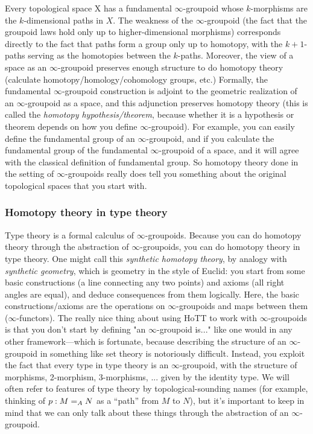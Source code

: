 Every topological space X has a fundamental $\infty$-groupoid whose
$k$-morphisms are the $k$-dimensional paths in $X$.  The weakness of the
$\infty$-groupoid (the fact that the groupoid laws hold only up to
higher-dimensional morphisms) corresponds directly to the fact that
paths form a group only up to homotopy, with the $k+1$-paths serving as the
homotopies between the $k$-paths.  Moreover, the view of a space as an
$\infty$-groupoid preserves enough structure to do homotopy theory
(calculate homotopy/homology/cohomology groups, etc.)  Formally, the
fundamental $\infty$-groupoid construction is adjoint to the geometric
realization of an $\infty$-groupoid as a space, and this adjunction
preserves homotopy theory (this is called the \emph{homotopy
  hypothesis/theorem}, because whether it is a hypothesis or theorem
depends on how you define $\infty$-groupoid).  For example, you can
easily define the fundamental group of an $\infty$-groupoid, and if you
calculate the fundamental group of the fundamental $\infty$-groupoid of
a space, and it will agree with the classical definition of fundamental
group.  So homotopy theory done in the setting of $\infty$-groupoids
really does tell you something about the original topological spaces
that you start with.  

\subsubsection{Homotopy theory in type theory}

Type theory is a formal calculus of $\infty$-groupoids. Because you can
do homotopy theory through the abstraction of $\infty$-groupoids, you
can do homotopy theory in type theory.  One might call this
\emph{synthetic homotopy theory}, by analogy with \emph{synthetic
  geometry}, which is geometry in the style of Euclid: you start from
some basic constructions (a line connecting any two points) and axioms
(all right angles are equal), and deduce consequences from them
logically.  Here, the basic constructions/axioms are the operations on
$\infty$-groupoids and maps between them ($\infty$-functors).  The
really nice thing about using HoTT to work with $\infty$-groupoids is
that you don't start by defining "an $\infty$-groupoid is..." like one
would in any other framework---which is fortunate, because describing
the structure of an $\infty$-groupoid in something like set theory is
notoriously difficult.  Instead, you exploit the fact that every type in
type theory is an $\infty$-groupoid, with the structure of morphisms,
2-morphism, 3-morphisms, ... given by the identity type.  We will often
refer to features of type theory by topological-sounding names (for
example, thinking of $p : \id[A] M N$ as a ``path'' from $M$ to $N$),
but it's important to keep in mind that we can only talk about these
things through the abstraction of an $\infty$-groupoid.

